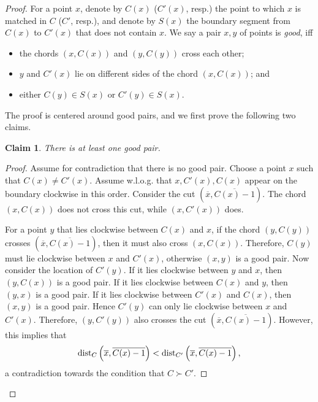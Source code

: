 \documentclass[11pt]{article}
\newtheorem{claim}[theorem]{Claim}
\newcommand{\dist}{\textnormal{dist}}
\begin{document}
\begin{proof}
For a point $x$, denote by $C(x)$ ($C'(x)$, resp.) the point to which $x$ is matched in $C$ ($C'$, resp.), and denote by $S(x)$ the boundary segment from $C(x)$ to $C'(x)$ that does not contain $x$. 
We say a pair $x,y$ of points is \emph{good}, iff 
\begin{itemize}
\item the chords $(x,C(x))$ and $(y,C(y))$ cross each other;
\item $y$ and $C'(x)$ lie on different sides of the chord $(x,C(x))$; and
\item either $C(y)\in S(x)$ or $C'(y) \in S(x)$.
\end{itemize}
The proof is centered around good pairs, and we first prove the following two claims.
\begin{claim} \label{clm:good}
        There is at least one good pair.
    \end{claim}
    \begin{proof}
Assume for contradiction that there is no good pair. Choose a point $x$ such that $C(x)\neq C'(x)$. Assume w.l.o.g. that $x, C'(x), C(x)$ appear on the boundary clockwise in this order. Consider the cut $\left(\overline{x},\overline{C(x)-1}\right)$. The chord $(x,C(x))$ does not cross this cut, while $(x,C'(x))$ does.

For a point $y$ that lies clockwise between $C(x)$ and $x$, if the chord $(y,C(y))$ crosses $\left(\overline{x},\overline{C(x)-1}\right)$, then it must also cross $(x,C(x))$. Therefore, $C(y)$ must lie clockwise between $x$ and $C'(x)$, otherwise $(x,y)$ is a good pair. 
Now consider the location of $C'(y)$. If it lies clockwise between $y$ and $x$, then $(y, C(x))$ is a good pair. If it lies clockwise between $C(x)$ and $y$, then $(y,x)$ is a good pair. If it lies clockwise between $C'(x)$ and $C(x)$, then $(x,y)$ is a good pair. Hence $C'(y)$ can only lie clockwise between $x$ and $C'(x)$. Therefore, $(y, C'(y))$ also crosses the cut $\left(\overline{x},\overline{C(x)-1}\right)$.
However, this implies that
\[\dist_C\left(\overline{x},\overline{C(x)-1}\right)<\dist_{C'}\left(\overline{x},\overline{C(x)-1}\right),\]  a contradiction towards the condition that $C\succ C'$.
\end{proof}


\end{proof}
\end{document}
